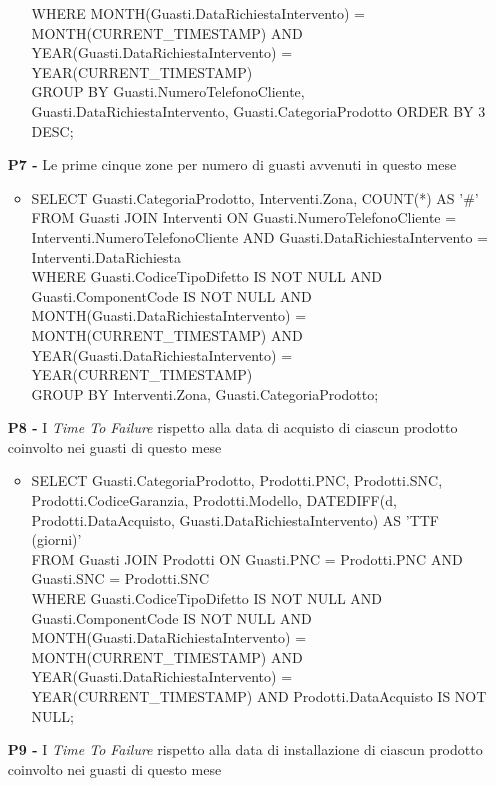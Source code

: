 \documentclass[a4paper, 12pt]{report}
\begin{document}
\begin{itemize}
\begin{itemize}[leftmargin=*, topsep=0pt]
			WHERE MONTH(Guasti.DataRichiestaIntervento) = MONTH(CURRENT\_TIMESTAMP) AND YEAR(Guasti.DataRichiestaIntervento) = YEAR(CURRENT\_TIMESTAMP)\\
			GROUP BY Guasti.NumeroTelefonoCliente, Guasti.DataRichiestaIntervento, Guasti.CategoriaProdotto ORDER BY 3 DESC;
		\end{itemize}
	\newpage
	\item[\textbf{P7 -}] Le prime cinque zone per numero di guasti avvenuti in questo mese
		\begin{itemize}[leftmargin=*, topsep=0pt]
			\item SELECT Guasti.CategoriaProdotto, Interventi.Zona, COUNT(*) AS '\#'\\
			FROM Guasti JOIN Interventi ON Guasti.NumeroTelefonoCliente = Interventi.NumeroTelefonoCliente AND Guasti.DataRichiestaIntervento = Interventi.DataRichiesta\\
			WHERE Guasti.CodiceTipoDifetto IS NOT NULL AND Guasti.ComponentCode IS NOT NULL AND MONTH(Guasti.DataRichiestaIntervento) = \\MONTH(CURRENT\_TIMESTAMP) AND YEAR(Guasti.DataRichiestaIntervento) = YEAR(CURRENT\_TIMESTAMP)\\
			GROUP BY Interventi.Zona, Guasti.CategoriaProdotto;
		\end{itemize}
	\item[\textbf{P8 -}] I \textit{Time To Failure} rispetto alla data di acquisto di ciascun prodotto coinvolto nei guasti di questo mese
		\begin{itemize}[leftmargin=*, topsep=0pt]
			\item SELECT Guasti.CategoriaProdotto, Prodotti.PNC, Prodotti.SNC, Prodotti.CodiceGaranzia, Prodotti.Modello, DATEDIFF(d, Prodotti.DataAcquisto, Guasti.DataRichiestaIntervento) AS 'TTF (giorni)'\\
			FROM Guasti JOIN Prodotti ON Guasti.PNC = Prodotti.PNC AND Guasti.SNC = Prodotti.SNC\\
			WHERE Guasti.CodiceTipoDifetto IS NOT NULL AND Guasti.ComponentCode IS NOT NULL AND MONTH(Guasti.DataRichiestaIntervento) = \\MONTH(CURRENT\_TIMESTAMP) AND YEAR(Guasti.DataRichiestaIntervento) = YEAR(CURRENT\_TIMESTAMP) AND Prodotti.DataAcquisto IS NOT NULL;
		\end{itemize}
	\item[\textbf{P9 -}] I \textit{Time To Failure} rispetto alla data di installazione di ciascun prodotto coinvolto nei guasti di questo mese
		\begin{itemize}[leftmargin=*, topsep=0pt]

\end{itemize}
\end{itemize}
\end{document}
